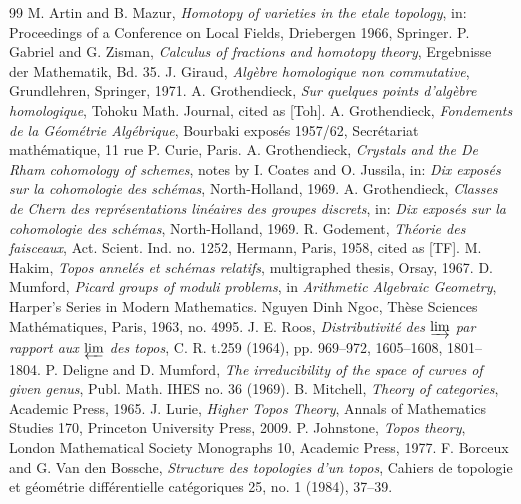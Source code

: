 \documentclass[11pt]{article}
\begin{document}
\begin{thebibliography}{99}
 M. Artin and B. Mazur, \emph{Homotopy of varieties in the etale topology}, in: Proceedings of a Conference on Local Fields, Driebergen 1966, Springer.
 P. Gabriel and G. Zisman, \emph{Calculus of fractions and homotopy theory}, Ergebnisse der Mathematik, Bd. 35.
 J. Giraud, \emph{Alg\`ebre homologique non commutative}, Grundlehren, Springer, 1971.
 A. Grothendieck, \emph{Sur quelques points d'alg\`ebre homologique}, Tohoku Math. Journal, cited as [Toh].
 A. Grothendieck, \emph{Fondements de la G\'eom\'etrie Alg\'ebrique}, Bourbaki expos\'es 1957/62, Secr\'etariat math\'ematique, 11 rue P. Curie, Paris.
 A. Grothendieck, \emph{Crystals and the De Rham cohomology of schemes}, notes by I. Coates and O. Jussila, in: \emph{Dix expos\'es sur la cohomologie des sch\'emas}, North-Holland, 1969.
 A. Grothendieck, \emph{Classes de Chern des repr\'esentations lin\'eaires des groupes discrets}, in: \emph{Dix expos\'es sur la cohomologie des sch\'emas}, North-Holland, 1969.
 R. Godement, \emph{Th\'eorie des faisceaux}, Act. Scient. Ind. no. 1252, Hermann, Paris, 1958, cited as [TF].
 M. Hakim, \emph{Topos annel\'es et sch\'emas relatifs}, multigraphed thesis, Orsay, 1967.
 D. Mumford, \emph{Picard groups of moduli problems}, in \emph{Arithmetic Algebraic Geometry}, Harper's Series in Modern Mathematics.
 Nguyen Dinh Ngoc, Th\`ese Sciences Math\'ematiques, Paris, 1963, no. 4995.
 J. E. Roos, \emph{Distributivit\'e des $\varinjlim$ par rapport aux $\varprojlim$ des topos}, C. R. t.259 (1964), pp. 969--972, 1605--1608, 1801--1804.
 P. Deligne and D. Mumford, \emph{The irreducibility of the space of curves of given genus}, Publ. Math. IHES no. 36 (1969).
 B. Mitchell, \emph{Theory of categories}, Academic Press, 1965.
 J. Lurie, \emph{Higher Topos Theory}, Annals of Mathematics Studies 170, Princeton University Press, 2009.
 P. Johnstone, \emph{Topos theory}, London Mathematical Society Monographs 10, Academic Press, 1977.
 F. Borceux and G. Van den Bossche, \emph{Structure des topologies d'un topos}, Cahiers de topologie et g\'eom\'etrie diff\'erentielle cat\'egoriques 25, no. 1 (1984), 37--39.
\end{thebibliography}
\end{document}
